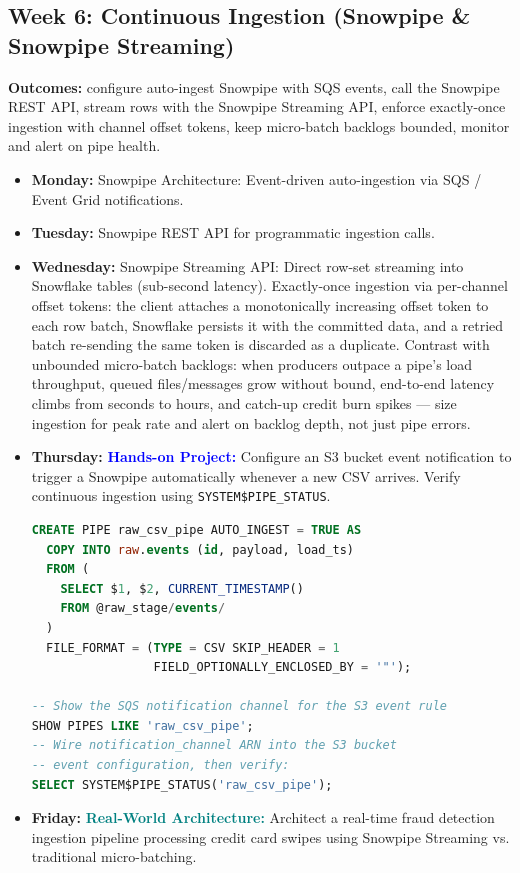 \documentclass[11pt, a4paper]{article}
\newcommand{\project}[1]{\textbf{\textcolor{blue}{Hands-on Project:}} #1}
\newcommand{\usecase}[1]{\textbf{\textcolor{teal}{Real-World Architecture:}} #1}
\newcommand{\dayitem}[2]{\item \textbf{#1:} #2}
\begin{document}
\subsection*{Week 6: Continuous Ingestion (Snowpipe \& Snowpipe Streaming)}
\par\noindent\textbf{Outcomes:} configure auto-ingest Snowpipe with SQS events, call the Snowpipe REST API, stream rows with the Snowpipe Streaming API, enforce exactly-once ingestion with channel offset tokens, keep micro-batch backlogs bounded, monitor and alert on pipe health.
\begin{itemize}[label=-]
    \dayitem{Monday}{Snowpipe Architecture: Event-driven auto-ingestion via SQS / Event Grid notifications.}
    \dayitem{Tuesday}{Snowpipe REST API for programmatic ingestion calls.}
    \dayitem{Wednesday}{Snowpipe Streaming API: Direct row-set streaming into Snowflake tables (sub-second latency). Exactly-once ingestion via per-channel offset tokens: the client attaches a monotonically increasing offset token to each row batch, Snowflake persists it with the committed data, and a retried batch re-sending the same token is discarded as a duplicate. Contrast with unbounded micro-batch backlogs: when producers outpace a pipe's load throughput, queued files/messages grow without bound, end-to-end latency climbs from seconds to hours, and catch-up credit burn spikes --- size ingestion for peak rate and alert on backlog depth, not just pipe errors.}
    \dayitem{Thursday}{\project{Configure an S3 bucket event notification to trigger a Snowpipe automatically whenever a new CSV arrives. Verify continuous ingestion using \texttt{SYSTEM\$PIPE\_STATUS}.}}
\begin{lstlisting}[language=SQL, caption={Snowpipe auto-ingest with SQS notification}]
CREATE PIPE raw_csv_pipe AUTO_INGEST = TRUE AS
  COPY INTO raw.events (id, payload, load_ts)
  FROM (
    SELECT $1, $2, CURRENT_TIMESTAMP()
    FROM @raw_stage/events/
  )
  FILE_FORMAT = (TYPE = CSV SKIP_HEADER = 1
                 FIELD_OPTIONALLY_ENCLOSED_BY = '"');

-- Show the SQS notification channel for the S3 event rule
SHOW PIPES LIKE 'raw_csv_pipe';
-- Wire notification_channel ARN into the S3 bucket
-- event configuration, then verify:
SELECT SYSTEM$PIPE_STATUS('raw_csv_pipe');
\end{lstlisting}
    \dayitem{Friday}{\usecase{Architect a real-time fraud detection ingestion pipeline processing credit card swipes using Snowpipe Streaming vs. traditional micro-batching.}}
\end{itemize}
\end{document}

